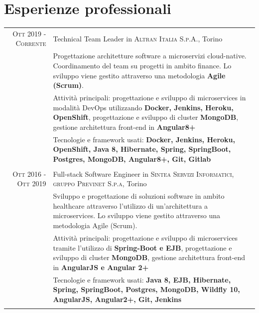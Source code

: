 \documentclass[a4paper,10pt]{article}
\begin{document}

\section{Esperienze professionali}

\begin{tabular}{r|p{11cm}}
\textsc{Ott 2019 - Corrente} & Technical Team Leader in \textsc{Altran Italia S.p.A.}, Torino \emph{}\\
& \footnotesize{Progettazione architetture software a microservizi cloud-native. Coordinamento del team su progetti in ambito finance. Lo sviluppo viene gestito attraverso una metodologia \textbf{Agile (Scrum)}.}\\
& \footnotesize{Attività principali: progettazione e sviluppo di microservices in modalità DevOps utilizzando \textbf{Docker, Jenkins, Heroku, OpenShift}, progettazione e sviluppo di cluster \textbf{MongoDB}, gestione architettura front-end in \textbf{Angular8+} }\\
& \footnotesize{Tecnologie e framework usati: \textbf{Docker, Jenkins, Heroku, OpenShift, Java 8, Hibernate, Spring, SpringBoot, Postgres, MongoDB, Angular8+, Git, Gitlab} }\\
\multicolumn{2}{c}{} \\


\textsc{Ott 2016 - Ott 2019} & Full-stack Software Engineer in \textsc{Sintea Servizi Informatici, gruppo Previnet S.p.a}, Torino \emph{}\\
& \footnotesize{Sviluppo e progettazione di soluzioni software in ambito healthcare attraverso l'utilizzo di un'architettura a microservices. Lo sviluppo viene gestito attraverso una metodologia Agile (Scrum). }\\
& \footnotesize{Attività principali: progettazione e sviluppo di microservices tramite l'utilizzo di \textbf{Spring-Boot e EJB}, progettazione e sviluppo di cluster \textbf{MongoDB}, gestione architettura front-end in \textbf{AngularJS e Angular 2+} }\\
& \footnotesize{Tecnologie e framework usati: \textbf{Java 8, EJB, Hibernate, Spring, SpringBoot, Postgres, MongoDB, Wildfly 10, AngularJS, Angular2+, Git, Jenkins} }\\
\multicolumn{2}{c}{} \\


\end{tabular}
\end{document}
